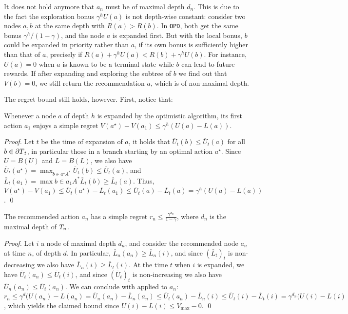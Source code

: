 \documentclass[runningheads]{llncs}
\begin{document}
\begin{remark}
It does not hold anymore that $a_n$ must be of maximal depth $d_n$.  This is due to the fact the exploration bonus $\gamma^h U(a)$ is not depth-wise constant: consider two nodes $a,b$ at the same depth with $R(a) > R(b)$. In \texttt{OPD}, both get the same bonus $\gamma^h/(1-\gamma)$, and the node $a$ is expanded first. But with the local bonus, $b$ could be expanded in priority rather than $a$, if its own bonus is sufficiently higher than that of $a$, precisely if $R(a)+\gamma^h U(a) < R(b)+\gamma^h U(b)$. For instance, $U(a)=0$ when $a$ is known to be a terminal state while $b$ can lead to future rewards. If after expanding and exploring the subtree of $b$ we find out that $V(b) = 0$, we still return the recommendation $a$, which is of non-maximal depth.
\end{remark}

The regret bound still holds, however. First, notice that:
\begin{lemma}
\label{lemma:expansion-bound}
Whenever a node $a$ of depth $h$ is expanded by the optimistic algorithm, its first action $a_1$ enjoys a simple regret $V(a^\star)-V(a_1) \leq \gamma^h(U(a)-L(a))$. 
\end{lemma}
\begin{proof}
Let $t$ be the time of expansion of $a$, it holds that $\overline{U}_t(b) \leq \overline{U}_t(a)$ for all $b\in {\partial T}_t$, in particular those in a branch starting by an optimal action $a^\star$. Since $U=B(U)$ and $L=B(L)$, we also have $\overline{U}_t(a^\star) = \max_{b\in a^\star A^*} \overline{U}_t(b) \leq \overline{U}_t(a)$, and $\overline{L}_t(a_1) = \max{b\in a_1 A^*} \overline{L}_t(b) \geq  \overline{L}_t(a)$. Thus, $V(a^\star)-V(a_1) \leq \overline{U}_t(a^\star) - \overline{L}_t(a_1) \leq \overline{U}_t(a) - \overline{L}_t(a) = \gamma^h(U(a)-L(a))$.
\qed\end{proof}
 
\begin{lemma}
The recommended action $a_n$ has a simple regret $r_n \leq \frac{\gamma^{d_n}}{1-\gamma}$, where $d_n$ is the maximal depth of $T_n$.
\end{lemma}
\begin{proof}
Let $i$ a node of maximal depth $d_n$, and consider the recommended node $a_n$ at time $n$, of depth $d$. In particular, $\overline{L}_n(a_n) \geq \overline{L}_n(i)$, and since $(\overline{L}_t)_t$ is non-decreasing we also have $\overline{L}_n(i) \geq \overline{L}_t(i)$. At the time $t$ when $i$ is expanded, we have $\overline{U}_t(a_n) \leq \overline{U}_t(i)$, and since $(\overline{U}_t)_t$ is non-increasing we also have $\overline{U}_n(a_n) \leq \overline{U}_t(a_n)$. We can conclude with  applied to $a_n$: $r_n \leq \gamma^d(U(a_n)-L(a_n) = \overline{U}_n(a_n) - \overline{L}_n(a_n)  \leq \overline{U}_t(a_n) - \overline{L}_n(i) \leq \overline{U}_t(i) - \overline{L}_t(i) = \gamma^{d_n}(U(i) - L(i)$, which yields the claimed bound since $U(i) - L(i) \leq V_{\max}-0$.
\qed\end{proof}
\end{document}
